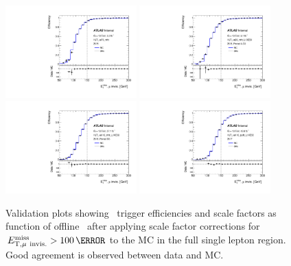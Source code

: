 \begin{figure}[tb!]
	\centering
	\includegraphics[width=0.45\textwidth]{chapters/c6/fig/METTriggerCalibration/validation_HLT_xe70_mht.pdf}
	\includegraphics[width=0.45\textwidth]{chapters/c6/fig/METTriggerCalibration/validation_HLT_xe90_mht_L1XE50.pdf}
	\includegraphics[width=0.45\textwidth]{chapters/c6/fig/METTriggerCalibration/validation_HLT_xe110_mht_L1XE50.pdf}
	\includegraphics[width=0.45\textwidth]{chapters/c6/fig/METTriggerCalibration/validation_HLT_xe110_pufit_L1XE55.pdf}
	\caption{Validation plots showing \MET~trigger efficiencies and scale factors as function of offline \METnomu~after applying scale factor corrections for $\METnomu>100\,\GeV$ to the MC in the full single lepton region. Good agreement is observed between data and MC.}
	\label{fig:TrigSF_validation}
\end{figure}



